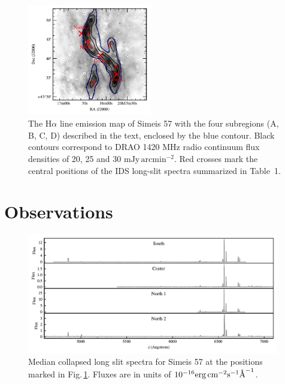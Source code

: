 \documentclass{aa}
\begin{document}
\begin{figure}
\includegraphics[width=0.48\textwidth]{Ha_overview.pdf}
\centering
\caption{The H$\alpha$ line emission map of Simeis 57 with
  the four subregions (A, B, C, D) described in the text, enclosed by
  the blue contour. Black contours correspond to DRAO 1420 MHz radio 
  continuum flux densities
  of 20, 25 and 30 $\mathrm{mJy \, arcmin^{-2}}$. Red crosses mark the
  central positions of the IDS long-slit spectra summarized in Table~1.}
\label{fig:Ha_overview}
\end{figure}


\section{Observations}



\begin{figure}
\includegraphics[width=0.98\textwidth]{Sim_INTspectra_NS.pdf}
\centering
\caption{Median collapsed long slit spectra for Simeis 57 at the
  positions marked in Fig.\,\ref{fig:Ha_overview}. Fluxes are in units
  of $10^{-16}\mathrm{erg\, cm^{-2} s^{-1}\AA^{-1}}$. }
\label{fig:spectra_3incol}
\end{figure}

\end{document}
